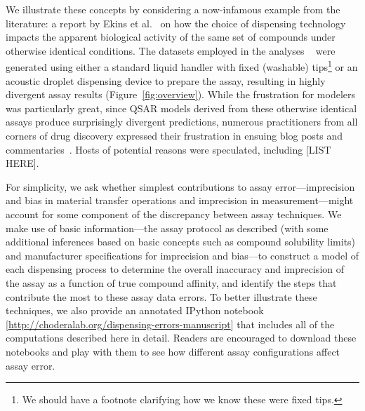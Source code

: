 \documentclass[aps,pre,twocolumn,nofootinbib,superscriptaddress,linenumbers]{revtex4-1}
\begin{document}
We illustrate these concepts by considering a now-infamous example from the literature: a report by Ekins et al.~\cite{ekins_dispensing_2013} on how the choice of dispensing technology impacts the apparent biological activity of the same set of compounds under otherwise identical conditions.
The datasets employed in the analyses ~\cite{barlaam_novel_2009,barlaam_pyrimidine_2010} were generated using either a standard liquid handler with fixed (washable) tips\footnote{{\color{red}We should have a footnote clarifying how we know these were fixed tips.}} or an acoustic droplet dispensing device to prepare the assay, resulting in highly divergent assay results (Figure~\ref{fig:overview}).
While the frustration for modelers was particularly great, since QSAR models derived from these otherwise identical assays produce surprisingly divergent predictions, numerous practitioners from all corners of drug discovery expressed their frustration in ensuing blog posts and commentaries~\cite{lowe_drug_2015,evanko_serial_2013,ekins_what_2013}.
Hosts of potential reasons were speculated, including {\color{red}[LIST HERE]}.

For simplicity, we ask whether simplest contributions to assay error---imprecision and bias in material transfer operations and imprecision in measurement---might account for some component of the discrepancy between assay techniques.
We make use of basic information---the assay protocol as described (with some additional inferences based on basic concepts such as compound solubility limits) and manufacturer specifications for imprecision and bias---to construct a model of each dispensing process to determine the overall inaccuracy and imprecision of the assay as a function of true compound affinity, and identify the steps that contribute the most to these assay data errors.
To better illustrate these techniques, we also provide an annotated IPython notebook [\url{http://choderalab.org/dispensing-errors-manuscript}] that includes all of the computations described here in detail.
Readers are encouraged to download these notebooks and play with them to see how different assay configurations affect assay error.
\end{document}

